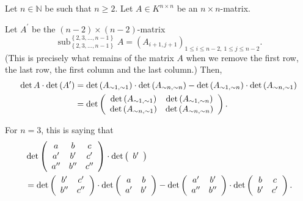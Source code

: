 \begin{theorem}
\label{thm.det.des-jac-1}Let $n\in
\mathbb{N}$ be such that $n\geq2$. Let $A\in K^{n\times n}$ be an $n\times n$-matrix.

Let $A^{\prime}$ be the $\left(  n-2\right)  \times\left(  n-2\right)
$-matrix%
\[
\operatorname*{sub}\nolimits_{\left\{  2,3,\ldots,n-1\right\}  }^{\left\{
2,3,\ldots,n-1\right\}  }A=\left(  A_{i+1,j+1}\right)  _{1\leq i\leq
n-2,\ 1\leq j\leq n-2}.
\]
(This is precisely what remains of the matrix $A$ when we remove the first
row, the last row, the first column and the last column.) Then,%
\begin{align*}
\det A\cdot\det\left(  A^{\prime}\right)   &  =\det\left(  A_{\sim1,\sim
1}\right)  \cdot\det\left(  A_{\sim n,\sim n}\right)  -\det\left(
A_{\sim1,\sim n}\right)  \cdot\det\left(  A_{\sim n,\sim1}\right) \\
&  =\det\left(
\begin{array}
[c]{cc}%
\det\left(  A_{\sim1,\sim1}\right)  & \det\left(  A_{\sim1,\sim n}\right) \\
\det\left(  A_{\sim n,\sim1}\right)  & \det\left(  A_{\sim n,\sim n}\right)
\end{array}
\right)  .
\end{align*}

\end{theorem}

\begin{example}
For $n=3$, this is saying that%
\begin{align*}
&  \det\left(
\begin{array}
[c]{ccc}%
a & b & c\\
a^{\prime} & b^{\prime} & c^{\prime}\\
a^{\prime\prime} & b^{\prime\prime} & c^{\prime\prime}%
\end{array}
\right)  \cdot\det\left(
\begin{array}
[c]{c}%
b^{\prime}%
\end{array}
\right) \\
&  =\det\left(
\begin{array}
[c]{cc}%
b^{\prime} & c^{\prime}\\
b^{\prime\prime} & c^{\prime\prime}%
\end{array}
\right)  \cdot\det\left(
\begin{array}
[c]{cc}%
a & b\\
a^{\prime} & b^{\prime}%
\end{array}
\right)  -\det\left(
\begin{array}
[c]{cc}%
a^{\prime} & b^{\prime}\\
a^{\prime\prime} & b^{\prime\prime}%
\end{array}
\right)  \cdot\det\left(
\begin{array}
[c]{cc}%
b & c\\
b^{\prime} & c^{\prime}%
\end{array}
\right)  .
\end{align*}

\end{example}

